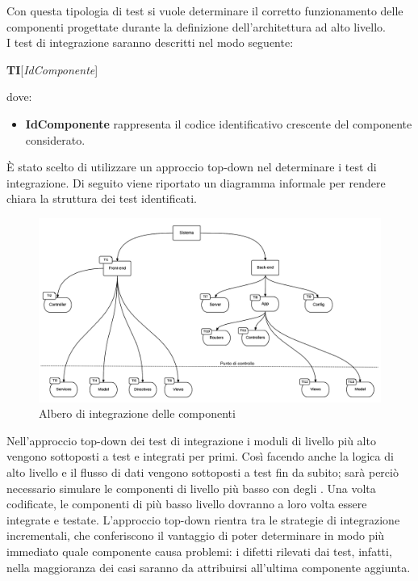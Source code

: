 Con questa tipologia di test si vuole determinare il corretto funzionamento delle componenti progettate durante la definizione dell'architettura ad alto livello.\\
I test di integrazione saranno descritti nel modo seguente:
\begin{center}
\textbf{TI}[\textit{IdComponente}]
\end{center}
dove:
\begin{itemize}
\item \textbf{IdComponente} rappresenta il codice identificativo crescente del componente considerato.
\end{itemize}
\`E stato scelto di utilizzare un approccio top-down nel determinare i test di integrazione. Di seguito viene riportato un diagramma informale per rendere chiara la struttura dei test identificati.
\begin{center}
\begin{figure}[h]
\centering
\includegraphics[scale=0.45,keepaspectratio]{Img/alberoTestIntegrazione.png}
\caption{Albero di integrazione delle componenti}
\end{figure}
\FloatBarrier
\end{center}
Nell'approccio top-down dei test di integrazione i moduli di livello più alto vengono sottoposti a test e integrati per primi. Così facendo anche la logica di alto livello e il flusso di dati vengono sottoposti a test fin da subito; sarà perciò necessario simulare le componenti di livello più basso con degli . Una volta codificate, le componenti di più basso livello dovranno a loro volta essere integrate e testate. L'approccio top-down rientra tra le strategie di integrazione incrementali, che conferiscono il vantaggio di poter determinare in modo più immediato quale componente causa problemi: i difetti rilevati dai test, infatti, nella maggioranza dei casi saranno da attribuirsi all'ultima componente aggiunta.
